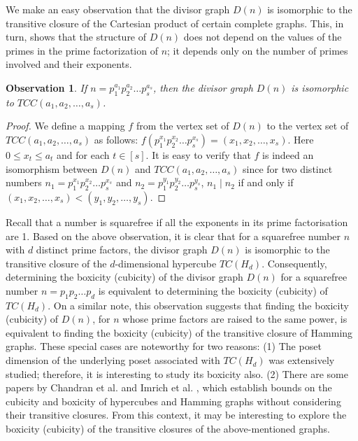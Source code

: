 \documentclass[twoside, 11pt]{article}
\newtheorem{observation}{Observation}
\begin{document}
We make an easy observation that the divisor graph $D(n)$ is isomorphic to the transitive closure of the Cartesian product of certain complete graphs. This, in turn, shows that the structure of  $D(n)$ does not depend on the values of the primes in the prime factorization of $n$; it depends only on the number of primes involved and their exponents.


\begin{observation}\label{equivalence of divisor graph and tcc}
    If $n=p_1^{a_1}p_2^{a_2}\dots p_s^{a_s}$, then the divisor graph $D(n)$ is isomorphic to $TCC(a_1,a_2,
    \dots,a_s)$. 
\end{observation}
\begin{proof}
    We define a mapping $f$ from the vertex set of $D(n)$ to the vertex set of $TCC(a_1,a_2,\dots,a_s)$ as follows:
    $f(p_1^{x_1}p_2^{x_2}\dots p_s^{x_s})=(x_1,x_2,\dots,x_s)$. Here $0 \leq x_t \leq a_t$ and for each $t \in [s]$. It is easy to verify that $f$ is indeed an isomorphism between $D(n)$ and $TCC(a_1,a_2,
    \dots,a_s)$ since for two distinct numbers  $n_1 = p_1^{x_1}p_2^{x_2}\dots p_s^{x_s}$ and $n_2 = p_1^{y_1}p_2^{y_2}\dots p_s^{y_s}$, $n_1 \mid n_2$ if and only if $(x_1,x_2,\dots,x_s) < (y_1,y_2,\dots,y_s)$.
\end{proof}

Recall that a number is squarefree if all the exponents in its prime factorisation are 1. Based on the above observation, it is clear that for a squarefree number $n$ with $d$ distinct prime factors, the divisor graph $D(n)$ is isomorphic to the transitive closure of the $d$-dimensional hypercube $TC(H_d)$. Consequently, determining the boxicity (cubicity) of the divisor graph $D(n)$ for a squarefree number $n = p_1p_2 \dots p_d$ is equivalent to determining the boxicity (cubicity) of $TC(H_d)$. On a similar note,  this observation suggests that finding the boxicity (cubicity) of $D(n)$, for $n$ whose prime factors are raised to the same power, is equivalent to 
finding the boxicity (cubicity) of the transitive closure of Hamming graphs. These special cases are noteworthy for two reasons: (1)  The poset dimension of the underlying poset associated with $ TC(H_d)$ was extensively studied; therefore, it is interesting to study its boxicity also.  (2)  There are some papers by Chandran et al. \cite{chandran2008cubicity} and Imrich et al. \cite{chandran2015boxicity}, which establish bounds on the cubicity and boxicity of hypercubes and Hamming graphs without considering their transitive closures. From this context, it may be interesting to explore the boxicity (cubicity) of the transitive closures of the above-mentioned graphs. 
\end{document}
